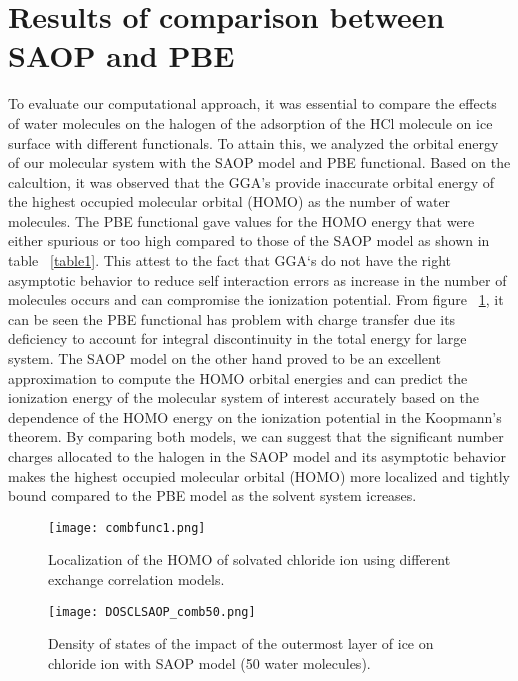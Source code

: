 \documentclass[a4paper,11pt]{report}
\begin{document}
\section{Results of comparison between SAOP and PBE}
To evaluate our computational approach, it was essential to compare the effects of water molecules on the halogen of the adsorption of  the HCl molecule on ice surface with different functionals. To attain this, we analyzed the orbital energy of our molecular system with the SAOP model and PBE functional. Based on the calcultion, it was observed that the GGA's provide inaccurate orbital energy of the highest occupied molecular orbital (HOMO) as the number of water molecules. The PBE functional gave values for the HOMO energy that were either spurious or too high compared to those of the SAOP model as shown in table ~\ref{table1}. This attest to the fact that GGA`s do not have the right asymptotic behavior to reduce self interaction errors as increase in the number of molecules occurs and can compromise the ionization potential. From figure ~\ref{figure0}, it can be seen the PBE functional has problem with charge transfer due its deficiency to account for integral discontinuity in the total energy for large system. The SAOP model on the other hand proved to be an excellent approximation to compute the HOMO orbital energies and can predict the ionization energy of the molecular system of interest accurately based on the dependence of the HOMO energy on the ionization potential in the Koopmann's theorem. By comparing both models, we can suggest that the significant number charges allocated to the halogen in the SAOP  model and its asymptotic behavior makes the highest occupied molecular orbital (HOMO) more localized and tightly bound compared to the PBE model as the solvent system icreases. 

\begin{figure}[H]\large
\texttt{[image: combfunc1.png]}
\caption{Localization of the HOMO of solvated chloride ion using different exchange correlation models.}
\label{figure0}
\end{figure}



\begin{figure}[H]\large
\texttt{[image: DOSCLSAOP\_comb50.png]}
\caption{Density of states of the impact of the outermost layer of ice on chloride ion with SAOP model (50 water molecules).}
\label{figure1a}
\end{figure}
\end{document}
